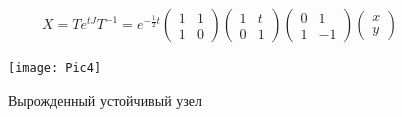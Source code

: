 \begin{figure}[!h]
\begin{minipage}[h]{0.49\linewidth}
\begin{gather*}
			X = T e^{tJ} T^{-1} = e^{-\frac{1}{2} t}
			\begin{pmatrix}
				1 & 1\\
				1 & 0
			\end{pmatrix}
			\begin{pmatrix}
				1 & t\\
				0 & 1
			\end{pmatrix}
			\begin{pmatrix}
				0 & 1\\
				1 & -1
			\end{pmatrix}
			\begin{pmatrix}
				x \\ y
			\end{pmatrix}
		\end{gather*}
	\end{minipage}
	\begin{minipage}[h]{0.49\linewidth}
		\texttt{[image: Pic4]}
		\caption{Вырожденный устойчивый узел}
	\end{minipage}
\end{figure}
\newpage


\newpage
